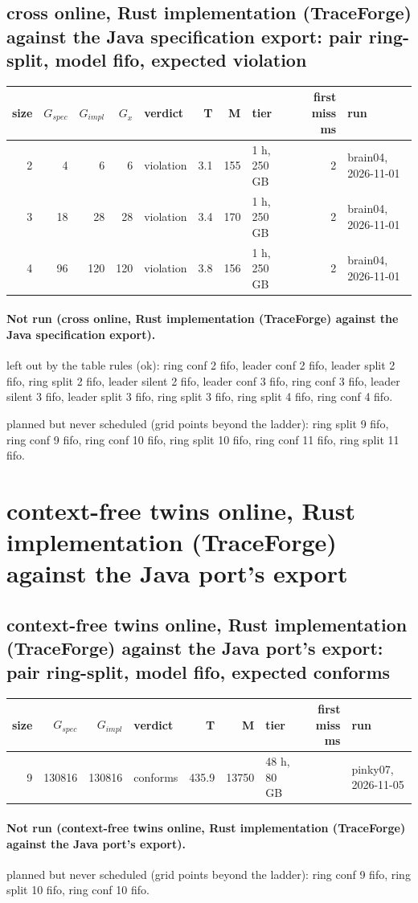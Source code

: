 \documentclass[10pt]{article}
\begin{document}
\subsection*{cross online, Rust implementation (TraceForge) against the Java specification export: pair \textsf{ring-split}, model fifo, expected violation}
\begin{longtable}{@{}rrrrlrrlrl@{}}
\toprule
size & $G_{\mathit{spec}}$ & $G_{\mathit{impl}}$ & $G_x$ & verdict & T & M & tier & first miss ms & run \\
\midrule
\endhead
\color{red} 2 & 4 & 6 & 6 & violation & 3.1 & 155 & 1 h, 250 GB & 2 & brain04, 2026-11-01 \\
\color{red} 3 & 18 & 28 & 28 & violation & 3.4 & 170 & 1 h, 250 GB & 2 & brain04, 2026-11-01 \\
\color{red} 4 & 96 & 120 & 120 & violation & 3.8 & 156 & 1 h, 250 GB & 2 & brain04, 2026-11-01 \\
\bottomrule
\end{longtable}
\paragraph{Not run (cross online, Rust implementation (TraceForge) against the Java specification export).}
left out by the table rules (ok): ring conf 2 fifo, leader conf 2 fifo, leader split 2 fifo, ring split 2 fifo, leader silent 2 fifo, leader conf 3 fifo, ring conf 3 fifo, leader silent 3 fifo, leader split 3 fifo, ring split 3 fifo, ring split 4 fifo, ring conf 4 fifo.\par
planned but never scheduled (grid points beyond the ladder): ring split 9 fifo, ring conf 9 fifo, ring conf 10 fifo, ring split 10 fifo, ring conf 11 fifo, ring split 11 fifo.\par
\section*{context-free twins online, Rust implementation (TraceForge) against the Java port's export}
\subsection*{context-free twins online, Rust implementation (TraceForge) against the Java port's export: pair \textsf{ring-split}, model fifo, expected conforms}
\begin{longtable}{@{}rrrlrrlrl@{}}
\toprule
size & $G_{\mathit{spec}}$ & $G_{\mathit{impl}}$ & verdict & T & M & tier & first miss ms & run \\
\midrule
\endhead
\color{red} 9 & 130816 & 130816 & conforms & 435.9 & 13750 & 48 h, 80 GB &  & pinky07, 2026-11-05 \\
\bottomrule
\end{longtable}
\paragraph{Not run (context-free twins online, Rust implementation (TraceForge) against the Java port's export).}
planned but never scheduled (grid points beyond the ladder): ring conf 9 fifo, ring split 10 fifo, ring conf 10 fifo.\par
\end{document}
